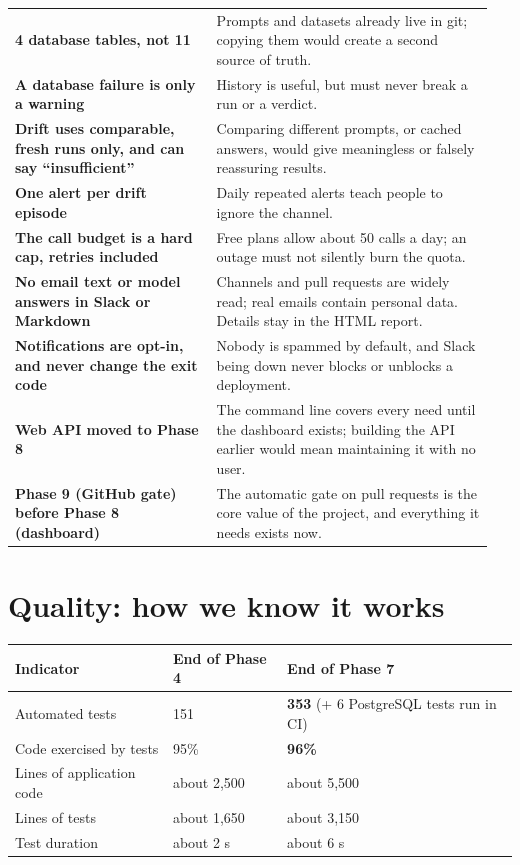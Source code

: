 \documentclass[11pt,a4paper]{article}
\begin{document}
\begin{longtable}{@{}p{0.40\linewidth}p{0.55\linewidth}@{}}
\textbf{4 database tables, not 11} & Prompts and datasets already live in git; copying them would create a second source of truth. \\
\textbf{A database failure is only a warning} & History is useful, but must never break a run or a verdict. \\
\textbf{Drift uses comparable, fresh runs only, and can say ``insufficient''} & Comparing different prompts, or cached answers, would give meaningless or falsely reassuring results. \\
\textbf{One alert per drift episode} & Daily repeated alerts teach people to ignore the channel. \\
\textbf{The call budget is a hard cap, retries included} & Free plans allow about 50 calls a day; an outage must not silently burn the quota. \\
\textbf{No email text or model answers in Slack or Markdown} & Channels and pull requests are widely read; real emails contain personal data. Details stay in the HTML report. \\
\textbf{Notifications are opt-in, and never change the exit code} & Nobody is spammed by default, and Slack being down never blocks or unblocks a deployment. \\
\textbf{Web API moved to Phase 8} & The command line covers every need until the dashboard exists; building the API earlier would mean maintaining it with no user. \\
\textbf{Phase 9 (GitHub gate) before Phase 8 (dashboard)} & The automatic gate on pull requests is the core value of the project, and everything it needs exists now. \\
\bottomrule
\end{longtable}

\section{Quality: how we know it works}

\begin{center}
\begin{tabular}{@{}lll@{}}
\toprule
\textbf{Indicator} & \textbf{End of Phase 4} & \textbf{End of Phase 7} \\
\midrule
Automated tests & 151 & \textbf{353} (+ 6 PostgreSQL tests run in CI) \\
Code exercised by tests & 95\% & \textbf{96\%} \\
Lines of application code & about 2,500 & about 5,500 \\
Lines of tests & about 1,650 & about 3,150 \\
Test duration & about 2 s & about 6 s \\
\bottomrule
\end{tabular}
\end{center}
\end{document}
